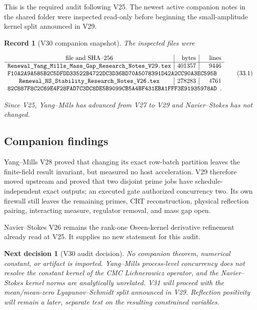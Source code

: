 \documentclass[11pt]{article}
\newtheorem{decision}[theorem]{Next decision}
\newtheorem{record}[theorem]{Record}
\theoremstyle{remark}
\begin{document}
This is the required audit following V25.  The newest active companion
notes in the shared folder were inspected read-only before beginning the
small-amplitude kernel split announced in V29.

\begin{record}[V30 companion snapshot]
\label{rec:v19v30-snapshot}
The inspected files were

\[
\begin{array}{c|r|r}
\hbox{file and SHA--256}&\hbox{bytes}&\hbox{lines}\\ \hline
\texttt{Renewal\_Yang\_Mills\_Mass\_Gap\_Research\_Notes\_V29.tex}
&401357&9446\\
\multicolumn{3}{l}{
\texttt{F10A2A9A585B2C5DFDD33522B4722DC3D36BD70A5078391D42A2CC90A3EC595B}}
\\
\texttt{Renewal\_NS\_Stability\_Research\_Notes\_V26.tex}
&278283&4761\\
\multicolumn{3}{l}{
\texttt{82C887F8C2C69E4F28FAD7C3DC8DE5B9099CB5A4BF431EBA1FFF3E91935978AD}}.
\end{array}                                                     \tag{33.1}
\]

Since V25, Yang--Mills has advanced from V27 to V29 and
Navier--Stokes has not changed.
\end{record}

\subsection{Companion findings}

Yang--Mills V28 proved that changing its exact row-batch partition leaves
the finite-field result invariant, but measured no host acceleration.
V29 therefore moved upstream and proved that two disjoint prime jobs have
schedule-independent exact outputs; an executed gate authorized
concurrency two.  Its own firewall still leaves the remaining primes,
CRT reconstruction, physical reflection pairing, interacting measure,
regulator removal, and mass gap open.

Navier--Stokes V26 remains the rank-one Oseen-kernel derivative
refinement already read at V25.  It supplies no new statement for this
audit.

\begin{decision}[V30 audit decision]
\label{dec:v19v30-audit}
No companion theorem, numerical constant, or artifact is imported.
Yang--Mills process-level concurrency does not resolve the constant kernel
of the CMC Lichnerowicz operator, and the Navier--Stokes kernel norms are
analytically unrelated.  V31 will proceed with the mean/mean-zero
Lyapunov--Schmidt split announced in V29.  Reflection positivity will
remain a later, separate test on the resulting constrained variables.
\end{decision}
\end{document}
